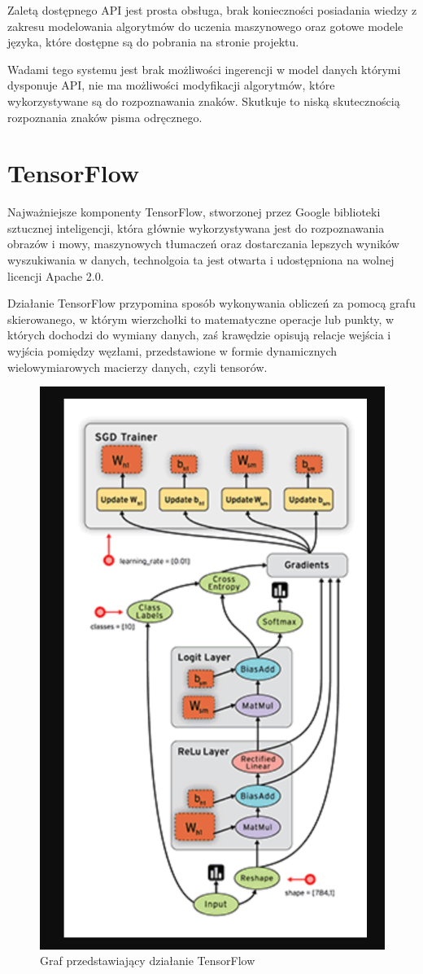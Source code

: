 \documentclass[brudnopis]{xmgr}
\begin{document}
Zaletą dostępnego API jest prosta obsługa, brak konieczności posiadania wiedzy z zakresu modelowania algorytmów do uczenia maszynowego oraz gotowe modele języka, które dostępne są do pobrania na stronie projektu.

Wadami tego systemu jest brak możliwości ingerencji w model danych którymi dysponuje API, nie ma możliwości modyfikacji algorytmów, które wykorzystywane są do rozpoznawania znaków. Skutkuje to niską skutecznością rozpoznania znaków pisma odręcznego.

\section{TensorFlow}

Najważniejsze komponenty TensorFlow, stworzonej przez Google biblioteki sztucznej inteligencji, która głównie wykorzystywana jest do rozpoznawania obrazów i mowy, maszynowych tłumaczeń oraz dostarczania lepszych wyników wyszukiwania w danych, technolgoia ta jest otwarta i udostępniona na wolnej licencji Apache 2.0.

Działanie TensorFlow przypomina sposób wykonywania obliczeń za pomocą grafu skierowanego, w którym wierzchołki to matematyczne operacje lub punkty, w których dochodzi do wymiany danych, zaś krawędzie opisują relacje wejścia i wyjścia pomiędzy węzłami, przedstawione w formie dynamicznych wielowymiarowych macierzy danych, czyli tensorów.

\begin{figure}[!tbh]
\centering
\includegraphics[width=.8\hsize]{fig/tf}
\caption{Graf przedstawiający działanie TensorFlow}
\end{figure}
\newpage
\end{document}
